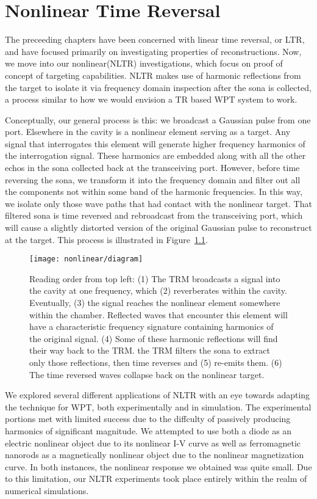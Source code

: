 \chapter{Nonlinear Time Reversal}
\label{ch:nltr}

The preceeding chapters have been concerned with linear time reversal, or LTR, and have focused primarily on investigating properties of reconstructions. Now, we move into our nonlinear(NLTR) investigations, which focus on proof of concept of targeting capabilities. NLTR makes use of harmonic reflections from the target to isolate it via frequency domain inspection after the sona is collected, a process similar to how we would envision a TR based WPT system to work.

Conceptually, our general process is this: we broadcast a Gaussian pulse from one port. Elsewhere in the cavity is a nonlinear element serving as a target. Any signal that interrogates this element will generate higher frequency harmonics of the interrogation signal. These harmonics are embedded along with all the other echos in the sona collected back at the transceiving port. However, before time reversing the sona, we transform it into the frequency domain and filter out all the components not within some band of the harmonic frequencies. In this way, we isolate only those wave paths that had contact with the nonlinear target. That filtered sona is time reversed and rebroadcast from the transceiving port, which will cause a slightly distorted version of the original Gaussian pulse to reconstruct at the target. This process is illustrated in Figure~\ref{fig:nonlinear-diagram}.

\begin{figure}[h!]
\centering
\texttt{[image: nonlinear/diagram]}
    \caption[Conceptual overview of nonlinear time reversal]{Reading order from top left: (1) The TRM broadcasts a signal into the cavity at one frequency, which (2) reverberates within the cavity. Eventually, (3) the signal reaches the nonlinear element somewhere within the chamber. Reflected waves that encounter this element will have a characteristic frequency signature containing harmonics of the original signal. (4) Some of these harmonic reflections will find their way back to the TRM. the TRM filters the sona to extract only those reflections, then time reverses and (5) re-emits them. (6) The time reversed waves collapse back on the nonlinear target.}
    \label{fig:nonlinear-diagram}
\end{figure}

We explored several different applications of NLTR with an eye towards adapting the technique for WPT, both experimentally and in simulation. The experimental portions met with limited success due to the diffculty of passively producing harmonics of significant magnitude. We attempted to use both a diode as an electric nonlinear object due to its nonlinear I-V curve as well as ferromagnetic nanorods as a magnetically nonlinear object due to the nonlinear magnetization curve. In both instances, the nonlinear response we obtained was quite small. Due to this limitation, our NLTR experiments took place entirely within the realm of numerical simulations. 
